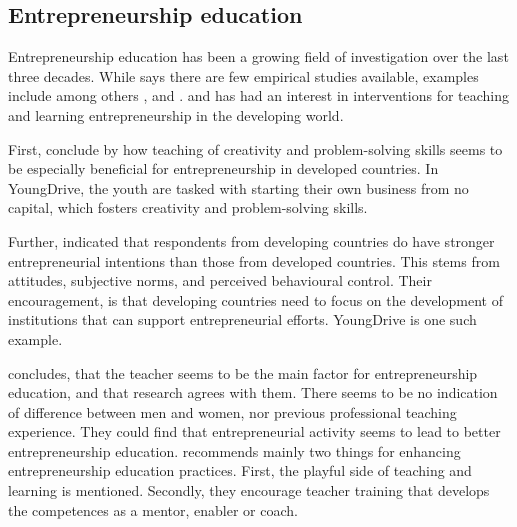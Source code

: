 \subsection{Entrepreneurship education}

%

%




Entrepreneurship education has been a growing field of investigation over the last three decades. While \cite{dickson} says there are few empirical studies available, examples include among others \cite{kuratko}, \cite{pittaway} and \cite{bae}. \cite{oviawe} and \cite{iakovleva} has had an interest in interventions for teaching and learning entrepreneurship in the developing world.



First, \cite{oviawe} conclude by how teaching of creativity and problem-solving skills seems to be especially beneficial for entrepreneurship in developed countries. In YoungDrive, the youth are tasked with starting their own business from no capital, which fosters creativity and problem-solving skills.

Further, \cite{iakovleva} indicated that respondents from developing countries do have stronger entrepreneurial intentions than those from developed countries. This stems from attitudes, subjective norms, and perceived behavioural control. Their encouragement, is that developing countries need to focus on the development of institutions that can support entrepreneurial efforts. YoungDrive is one such example.

\cite{ruskovaara} concludes, that the teacher seems to be the main factor for entrepreneurship education, and that research agrees with them. There seems to be no indication of difference between men and women, nor previous professional teaching experience. They could find that entrepreneurial activity seems to lead to better entrepreneurship education. \cite{dickson} recommends mainly two things for enhancing entrepreneurship education practices. First, the playful side of teaching and learning is mentioned. Secondly, they encourage teacher training that develops the competences as a mentor, enabler or coach.

